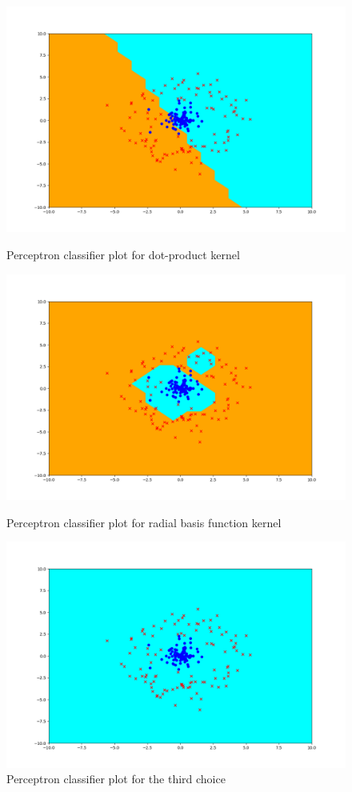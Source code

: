 \begin{answer}
	\begin{figure}[H]
		\centering
		\vspace{-2mm}
		\includegraphics[width=0.65\linewidth]{../src/perceptron/perceptron_dot_output.png}
		\caption{Perceptron classifier plot for dot-product kernel}
		\centering

		\vspace{2mm}
		\includegraphics[width=0.65\linewidth]{../src/perceptron/perceptron_rbf_output.png}
		\centering
	\caption{Perceptron classifier plot for radial basis function kernel}
	
			\centering
	
	\vspace{2mm}
	\includegraphics[width=0.65\linewidth]{../src/perceptron/perceptron_non_psd_output.png}
	\centering
	\caption{Perceptron classifier plot for the third choice}
	\end{figure}
\end{answer}
